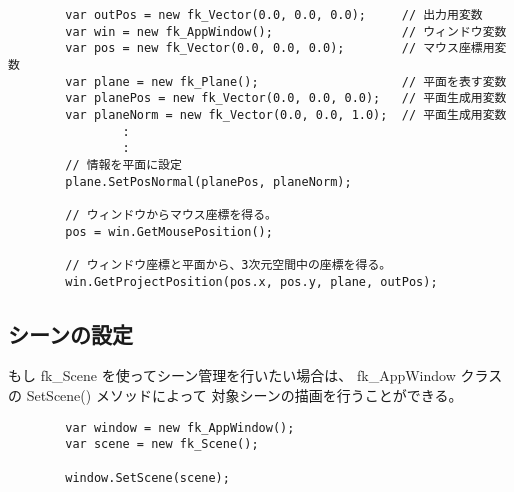 \begin{breakbox}
\begin{verbatim}
        var outPos = new fk_Vector(0.0, 0.0, 0.0);     // 出力用変数
        var win = new fk_AppWindow();                  // ウィンドウ変数
        var pos = new fk_Vector(0.0, 0.0, 0.0);        // マウス座標用変数
        var plane = new fk_Plane();                    // 平面を表す変数
        var planePos = new fk_Vector(0.0, 0.0, 0.0);   // 平面生成用変数
        var planeNorm = new fk_Vector(0.0, 0.0, 1.0);  // 平面生成用変数
                :
                :
        // 情報を平面に設定
        plane.SetPosNormal(planePos, planeNorm);

        // ウィンドウからマウス座標を得る。
        pos = win.GetMousePosition();

        // ウィンドウ座標と平面から、3次元空間中の座標を得る。
        win.GetProjectPosition(pos.x, pos.y, plane, outPos);
\end{verbatim}
\end{breakbox}

\subsection{シーンの設定}
もし fk\_Scene を使ってシーン管理を行いたい場合は、
fk\_AppWindow クラスの SetScene() メソッドによって
対象シーンの描画を行うことができる。

\begin{breakbox}
\begin{verbatim}
        var window = new fk_AppWindow();
        var scene = new fk_Scene();

        window.SetScene(scene);
\end{verbatim}
\end{breakbox}
